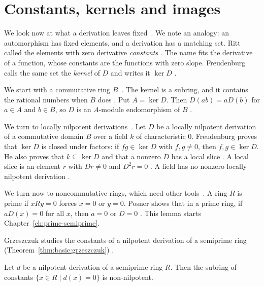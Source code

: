 \section{Constants, kernels and images}\label{sec:basic-theory:constants-kernels}

We look now at what a derivation leaves fixed~\cite[p.~2]{Freudenburg2017}. We note an analogy: an
automorphism has fixed elements, and a derivation has a matching set. Ritt
called the elements with zero derivative \emph{constants}
\cite[p.~1]{Ritt1950}. The name fits the derivative of a function, whose
constants are the functions with zero slope. Freudenburg calls the same set
the \emph{kernel} of $D$ and writes it $\ker D$ \cite[p.~2]{Freudenburg2017}.

We start with a commutative ring $B$~\cite[Proposition~1.6(a), p.~13]{Freudenburg2017}. The kernel is a subring,
and it contains the rational numbers when $B$ does
\cite[(C.3), (C.4), p.~2]{Freudenburg2017}. Put $A = \ker D$. Then
$D(ab) = aD(b)$ for $a \in A$ and $b \in B$, so $D$ is an $A$-module
endomorphism of $B$ \cite[Proposition~1.6(a), p.~13]{Freudenburg2017}.

We turn to locally nilpotent derivations~\cite[Corollary~1.22, p.~22]{Freudenburg2017}. Let $D$ be a locally nilpotent
derivation of a commutative domain $B$ over a field $k$ of characteristic $0$.
Freudenburg proves that $\ker D$ is closed under factors: if $fg \in \ker D$
with $f, g \neq 0$, then $f, g \in \ker D$. He also proves that $k \subseteq
\ker D$ and that a nonzero $D$ has a local slice \cite[Principle~1,
p.~21]{Freudenburg2017}. A local slice is an element $r$ with $Dr \neq 0$ and
$D^2r = 0$ \cite[p.~3]{Freudenburg2017}. A field has no nonzero locally
nilpotent derivation \cite[Corollary~1.22, p.~22]{Freudenburg2017}.

We turn now to noncommutative rings, which need other tools~\cite[Lemma~1,
p.~1093]{Posner1957}. A ring $R$ is
prime if $xRy = 0$ forces $x = 0$ or $y = 0$. Posner shows that in a prime
ring, if $aD(x) = 0$ for all $x$, then $a = 0$ or $D = 0$ \cite[Lemma~1,
p.~1093]{Posner1957}. This lemma starts Chapter~\ref{ch:prime-semiprime}.

Grzeszczuk studies the constants of a nilpotent derivation of a semiprime ring (Theorem~\ref{thm:basic:grzeszczuk})
\cite[p.~1857]{Grzeszczuk1993}.\begin{theorem}\label{thm:basic:grzeszczuk}
Let $d$ be a nilpotent derivation of a semiprime ring $R$. Then the subring of
constants $\{x\in R \mid d(x)=0\}$ is non-nilpotent.
\end{theorem}

